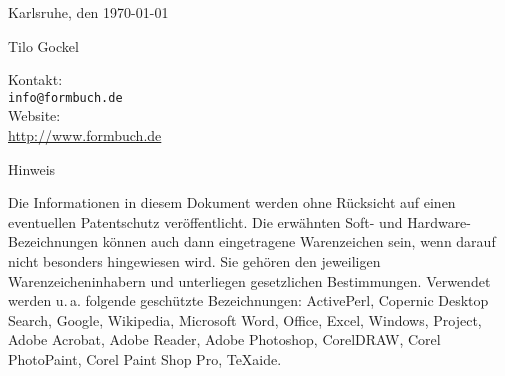 Karlsruhe, den \today

Tilo Gockel


\vspace{1cm}

Kontakt:\\
\verb$info@formbuch.de$\\

Website:\\
\url{http://www.formbuch.de}\\


\vspace{2cm}

Hinweis

Die Informationen in diesem Dokument werden ohne Rücksicht auf einen eventuellen Patentschutz veröffentlicht. Die erwähnten Soft- und Hardware-Bezeichnungen können auch dann eingetragene Warenzeichen sein, wenn darauf nicht besonders hingewiesen wird. Sie gehören den jeweiligen Warenzeicheninhabern und unterliegen gesetzlichen Bestimmungen. Verwendet werden u.\,a. folgende geschützte Bezeichnungen: ActivePerl, Copernic Desktop Search, Google, Wikipedia, Microsoft Word, Office, Excel, Windows, Project, Adobe Acrobat, Adobe Reader, Adobe Photoshop, CorelDRAW, Corel PhotoPaint, Corel Paint Shop Pro, \mbox{TeXaide}.

\color{black}
